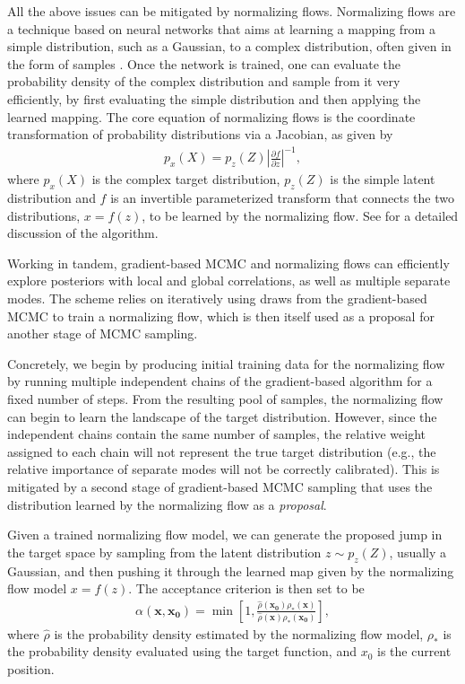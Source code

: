\documentclass[twocolumn]{aastex631}
\begin{document}
All the above issues can be mitigated by normalizing flows.  Normalizing flows
are a technique based on neural networks that aims at learning a mapping from a
simple distribution, such as a Gaussian, to a complex distribution, often given
in the form of samples \citep{2019arXiv190809257K, 2019arXiv191202762P}. Once
the network is trained, one can evaluate the probability density of the complex
distribution and sample from it very efficiently, by first evaluating the
simple distribution and then applying the learned mapping. The core equation
of normalizing flows is the coordinate transformation of probability
distributions via a Jacobian, as given by
\begin{align}
    p_x(X) = p_z(Z) \left| \frac{\partial f}{\partial z}\right|^{-1},
\end{align}
where $p_x(X)$ is the complex target distribution, $p_z(Z)$ is the simple
latent distribution and $f$ is an invertible parameterized transform that
connects the two distributions, $x = f(z)$, to be learned by the normalizing
flow. See \cite{2019arXiv190809257K, 2019arXiv191202762P} for a detailed
discussion of the algorithm.

Working in tandem, gradient-based MCMC and normalizing flows can efficiently
explore posteriors with local and global correlations, as well as multiple
separate modes.  The scheme relies on iteratively using draws from the
gradient-based MCMC to train a normalizing flow, which is then itself used as a
proposal for another stage of MCMC sampling.

Concretely, we begin by producing initial training data for the normalizing
flow by running multiple independent chains of the gradient-based algorithm for
a fixed number of steps.  From the resulting pool of samples, the normalizing
flow can begin to learn the landscape of the target distribution.
However, since the independent chains contain the same number of samples, the
relative weight assigned to each chain will not represent the true target
distribution (e.g., the relative importance of separate modes will not be
correctly calibrated). This is mitigated by a second stage of gradient-based
MCMC sampling that uses the distribution learned by the normalizing flow as a
\textit{proposal}.

Given a trained normalizing flow model, we can generate the proposed jump in
the target space by sampling from the latent distribution $z \sim p_z(Z)$,
usually a Gaussian, and then pushing it through the learned map given by the
normalizing flow model $x=f(z)$.  The acceptance criterion is then set to be
\begin{align} \label{eq:flow-proposal}
    \alpha(\mathbf{x},\mathbf{x_0}) = \min \left[ 1, \frac{\hat{\rho}(\mathbf{x_0})\rho_*(\mathbf{x})}{\hat{\rho}(\mathbf{x})\rho_*(\mathbf{x_0})}\right],
\end{align}
where $\hat{\rho}$ is the probability density estimated by the normalizing flow
model, $\rho_*$ is the probability density evaluated using the target function,
and $x_0$ is the current position.
\end{document}
